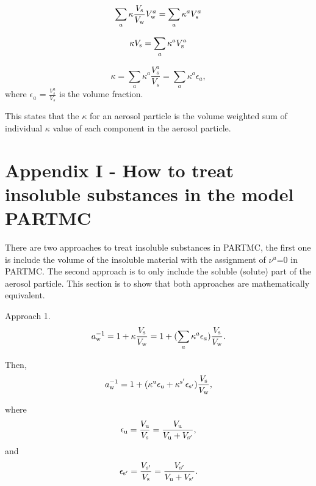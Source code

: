 \documentclass[12pt]{article}
\begin{document}
\begin{equation}\label{eqn:6.15}
\sum_{a} \kappa \frac{V_{\rm s}}{V_{\rm w}} V_{\rm w}^{a}= \sum_{a} \kappa^{a} V_{\rm s}^{a}
\end{equation}

\begin{equation}\label{eqn:6.16}
\kappa V_{\rm s}= \sum_{a} \kappa^{a} V_{\rm s}^{a}
\end{equation}

\begin{equation}\label{eqn:6.17}
\kappa= \sum_{a} \kappa^{a} \frac {V_{s}^{a}}{V_{s}} = \sum_{a} \kappa^{a} \epsilon_{a},
\end{equation}
where $\epsilon_{a}$ = $ \frac{V_{s}^{a}}{V_{s}}$ is the volume fraction.

This states that the $\kappa$ for an aerosol particle is the volume weighted sum of individual $\kappa$ value of each component in the aerosol particle.  

\section{Appendix I - How to treat insoluble substances in the model PARTMC}

There are two approaches to treat insoluble substances in PARTMC, the first one is include the volume of the insoluble material with the assignment of $\nu^{u}$=$0$ in PARTMC. The second approach is to only include the soluble (solute) part of the aerosol particle. This section is to show that both approaches are mathematically equivalent.
 
Approach 1. 
\begin{equation}\label{eqn:A1}
a_{\rm w}^{-1}=1+\kappa \frac{V_{\rm s}}{V_{\rm w}}=1+ (\sum_{a} \kappa^{a} \epsilon_{a})\frac{V_{\rm s}}{V_{\rm w}}.
\end{equation}

Then,
\begin{equation}\label{eqn:A2}
a_{\rm w}^{-1}=1+ (\kappa^{\rm u} \epsilon_{\rm u} +\kappa^{\rm s'} \epsilon_{\rm s'}) \frac{V_{\rm s}}{V_{\rm w}},
\end{equation}

where
\begin{equation}\label{eqn:A3}
\epsilon_{\rm u}=\frac{V_{\rm u}}{V_{\rm s}}=\frac{V_{\rm u}}{V_{\rm u}+V_{\rm s'}},
\end{equation}
and
\begin{equation}\label{eqn:A4}
\epsilon_{\rm s'}=\frac{V_{\rm s'}}{V_{\rm s}}=\frac{V_{\rm s'}}{V_{\rm u}+V_{\rm s'}}.
\end{equation}
\end{document}
